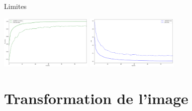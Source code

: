 \documentclass[10pt,xcolor={x11names}]{beamer}
\begin{document}
\begin{frame}{Limites}
	\begin{center}
		\includegraphics[width=12em]{train_3_acc.png}
		\includegraphics[width=12em]{train_3_loss.png}
	\end{center}
\end{frame}

\section{Transformation de l'image}
\end{document}
